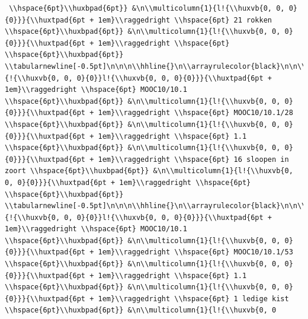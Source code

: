 \documentclass[11pt,preprint, authoryear]{elsarticle}
\numberwithin{equation}{section}
\numberwithin{figure}{section}
\numberwithin{table}{section}
\begin{document}
\begin{verbatim}
 \\hspace{6pt}\\huxbpad{6pt}} &\n\\multicolumn{1}{l!{\\huxvb{0, 0, 0}{0}}}{\\huxtpad{6pt + 1em}\\raggedright \\hspace{6pt} 21 rokken \\hspace{6pt}\\huxbpad{6pt}} &\n\\multicolumn{1}{l!{\\huxvb{0, 0, 0}{0}}}{\\huxtpad{6pt + 1em}\\raggedright \\hspace{6pt}  \\hspace{6pt}\\huxbpad{6pt}} \\tabularnewline[-0.5pt]\n\n\n\\hhline{}\n\\arrayrulecolor{black}\n\n\\multicolumn{1}{!{\\huxvb{0, 0, 0}{0}}l!{\\huxvb{0, 0, 0}{0}}}{\\huxtpad{6pt + 1em}\\raggedright \\hspace{6pt} MOOC10/10.1 \\hspace{6pt}\\huxbpad{6pt}} &\n\\multicolumn{1}{l!{\\huxvb{0, 0, 0}{0}}}{\\huxtpad{6pt + 1em}\\raggedright \\hspace{6pt} MOOC10/10.1/28 \\hspace{6pt}\\huxbpad{6pt}} &\n\\multicolumn{1}{l!{\\huxvb{0, 0, 0}{0}}}{\\huxtpad{6pt + 1em}\\raggedright \\hspace{6pt} 1.1 \\hspace{6pt}\\huxbpad{6pt}} &\n\\multicolumn{1}{l!{\\huxvb{0, 0, 0}{0}}}{\\huxtpad{6pt + 1em}\\raggedright \\hspace{6pt} 16 sloopen in zoort \\hspace{6pt}\\huxbpad{6pt}} &\n\\multicolumn{1}{l!{\\huxvb{0, 0, 0}{0}}}{\\huxtpad{6pt + 1em}\\raggedright \\hspace{6pt}  \\hspace{6pt}\\huxbpad{6pt}} \\tabularnewline[-0.5pt]\n\n\n\\hhline{}\n\\arrayrulecolor{black}\n\n\\multicolumn{1}{!{\\huxvb{0, 0, 0}{0}}l!{\\huxvb{0, 0, 0}{0}}}{\\huxtpad{6pt + 1em}\\raggedright \\hspace{6pt} MOOC10/10.1 \\hspace{6pt}\\huxbpad{6pt}} &\n\\multicolumn{1}{l!{\\huxvb{0, 0, 0}{0}}}{\\huxtpad{6pt + 1em}\\raggedright \\hspace{6pt} MOOC10/10.1/53 \\hspace{6pt}\\huxbpad{6pt}} &\n\\multicolumn{1}{l!{\\huxvb{0, 0, 0}{0}}}{\\huxtpad{6pt + 1em}\\raggedright \\hspace{6pt} 1.1 \\hspace{6pt}\\huxbpad{6pt}} &\n\\multicolumn{1}{l!{\\huxvb{0, 0, 0}{0}}}{\\huxtpad{6pt + 1em}\\raggedright \\hspace{6pt} 1 ledige kist \\hspace{6pt}\\huxbpad{6pt}} &\n\\multicolumn{1}{l!{\\huxvb{0, 0
\end{verbatim}
\end{document}
